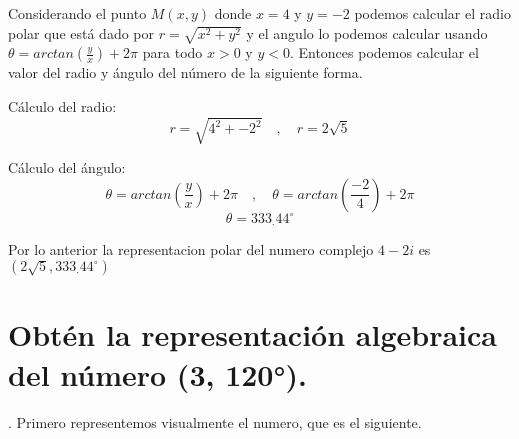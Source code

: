 \documentclass[a4paper,12pt]{article}
\begin{document}

Considerando el punto \(M(x,y)\)  donde  \(x= 4\)  y \(y=-2\) podemos calcular el radio polar que está dado por \(r = \sqrt{x^2 + y^2}\) y el angulo lo podemos calcular usando \( \theta = arctan(\frac{y}{x}) + 2\pi \) para todo \(x > 0\) y \( y < 0\).
Entonces podemos calcular el valor del radio y ángulo del número de la siguiente forma.

Cálculo del radio: 
\[r = \sqrt{4^2 + -2^2} \quad,\quad r = 2\sqrt{5}\]

Cálculo del ángulo:
\[\theta = arctan(\frac{y}{x}) + 2\pi \quad , \quad \theta = arctan(\frac{-2}{4}) + 2\pi \]
\[\theta = 333_\cdot44^\circ \]

Por lo anterior la representacion polar del numero complejo \(4-2i\) es \((2\sqrt{5}, 333_\cdot44^\circ 
 ) \)



\section{Obtén la representación algebraica del número (3, 120°).}.
Primero representemos visualmente el numero, que es el siguiente.
\end{document}

